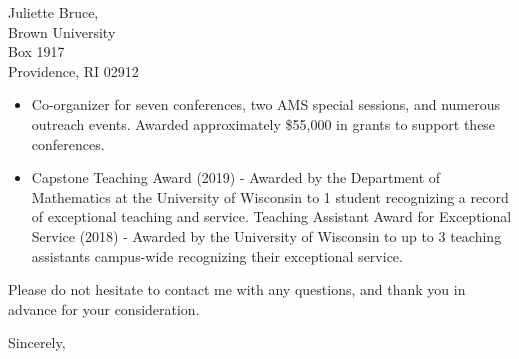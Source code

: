 \documentclass[11pt]{brownletter}
\begin{document}
\begin{letter}{Juliette Bruce,\\ 
               Brown University\\ 
               Box 1917\\ 
               Providence, RI 02912}
\begin{itemize}
\item Co-organizer for seven conferences, two AMS special sessions, and numerous outreach events. Awarded approximately \$55,000 in grants to support these conferences.  

\item Capstone Teaching Award (2019) - Awarded by the Department of Mathematics at the University of Wisconsin to 1 student recognizing a record of exceptional teaching and service. Teaching Assistant Award for Exceptional Service  (2018) - Awarded by the University of Wisconsin to up to 3 teaching assistants campus-wide recognizing their exceptional service.
\end{itemize}

Please do not hesitate to contact me with any questions, and thank you in advance for your consideration.

\closing{Sincerely,}




\end{letter}
\end{document}
